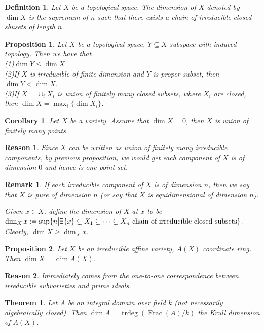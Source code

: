 \documentclass{ctexart}
\newtheorem{definition}{Definition}[section]
\newtheorem{remark}{Remark}[section]
\newtheorem{theorem}{Theorem}[section]
\newtheorem{proposition}{Proposition}[section]
\newtheorem{reason}{Reason}[section]
\newtheorem{corollary}{Corollary}[section]
\newcommand{\trdeg}{\operatorname{trdeg}}
\newcommand{\fraction}{\operatorname{Frac}}
\begin{document}
\begin{definition}
    Let $X$ be a topological space.
    The dimension of $X$ denoted by $\dim X$ is the supremum of $n$ such that there exists a chain of irreducible closed sbusets of length $n$.
\end{definition}
\begin{proposition}
    Let $X$ be a topological space, $Y \subseteq X$ subspace with induced topology.
    Then we have that \\
    (1)$\dim Y \le \dim X$ \\
    (2)If $X$ is irreducible of finite dimension and $Y$ is proper subset, then $\dim Y < \dim X$. \\
    (3)If $X = \cup_{i} X_{i}$ is union of finitely many closed subsets, where $X_{i}$ are closed, then $\dim X = \max_{i} \{\dim X_{i}\}$.
    \label{Proposition 4.1}
\end{proposition}
\begin{corollary}
    Let $X$ be a variety.
    Assume that $\dim X = 0$, then $X$ is union of finitely many points.
    \label{Corollary 4.1}
\end{corollary}
\begin{reason}
    Since $X$ can be written as union of finitely many irreducible components,
    by previous proposition, we would get each component of $X$ is of dimension $0$ and hence is one-point set.
\end{reason}
\begin{remark}
    If each irreducible component of $X$ is of dimension $n$, 
    then we say that $X$ is pure of dimension $n$ (or say that $X$ is equidimensional of dimension $n$).
    \par
    Given $x\in X$, define the dimension of $X$ at $x$ to be $\dim_{X} x := \sup \{n \big{|} \exists \{x\} \subsetneq X_{1} \subsetneq \cdots \subsetneq X_{n} \text{ chain of irreducible closed subsets}\}$.
    Clearly, $\dim X \ge \dim_{X} x$.
\end{remark}
\begin{proposition}
    Let $X$ be an irreducible affine variety, $A(X)$ coordinate ring.
    Then $\dim X = \dim A(X)$.
    \label{Proposition 4.2}
\end{proposition}
\begin{reason}
    Immediately comes from the one-to-one correspondence between irreducible subvarieties and prime ideals.
\end{reason}
\begin{theorem}
    Let $A$ be an integral domain over field $k$ (not necessarily algebraically closed).
    Then $\dim A = \trdeg(\fraction(A)/k)$ the Krull dimension of $A(X)$.
    \label{Theorem 4.1}
\end{theorem}
\end{document}
